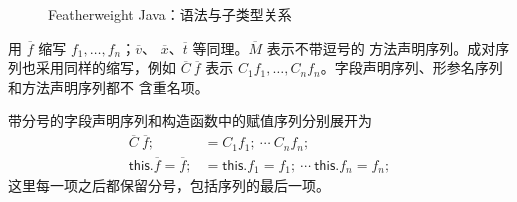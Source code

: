 \begin{figure}[!ht]
\centering
\begin{minipage}{0.98\linewidth}
\scriptsize
{}
\end{minipage}
\caption{Featherweight Java：语法与子类型关系}
\label{fig:19-1}
\end{figure}
\FloatBarrier

用 \(\overline f\) 缩写 \(f_1,\ldots,f_n\)；\(\overline v\)、
\(\overline x\)、\(\overline t\) 等同理。\(\overline M\) 表示不带逗号的
方法声明序列。成对序列也采用同样的缩写，例如
\(\overline C\ \overline f\) 表示
\(C_1 f_1,\ldots,C_n f_n\)。字段声明序列、形参名序列和方法声明序列都不
含重名项。

带分号的字段声明序列和构造函数中的赋值序列分别展开为
\[
\begin{aligned}
\overline C\ \overline f;
  &{}= C_1f_1;\ \cdots\ C_nf_n;\\
\mathsf{this}.\overline f=\overline f;
  &{}= \mathsf{this}.f_1=f_1;\ \cdots\
       \mathsf{this}.f_n=f_n;
\end{aligned}
\]
这里每一项之后都保留分号，包括序列的最后一项。

